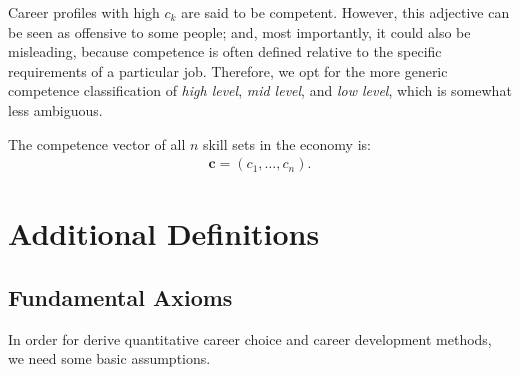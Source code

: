 \documentclass{elsarticle} %
\begin{document}
Career profiles with high $c_k$ are said to be competent. However, this
adjective can be seen as offensive to some people; and, most importantly, it
could also be misleading, because competence is often defined relative to the
specific requirements of a particular job. Therefore, we opt for the more
generic competence classification of \textit{high level}, \textit{mid level},
and \textit{low level}, which is somewhat less ambiguous.

The competence vector of all $n$ skill sets in the economy is:
\begin{gather}
    \boldsymbol{c} = (c_1, \dots, c_n)
    .
\end{gather}


\section{Additional Definitions}
\subsection{Fundamental Axioms}
In order for derive quantitative career choice and career development methods, we need some basic assumptions.
\end{document}
